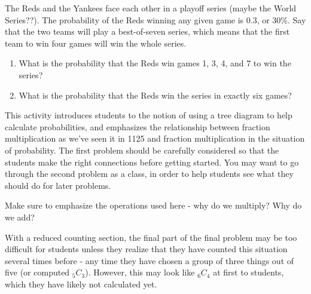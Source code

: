 \documentclass{ximera}
\begin{document}
\begin{problem}
The Reds and the Yankees face each other in a playoff series (maybe the World Series??).  The probability of the Reds winning any given game is 0.3, or 30\%.  Say that the two teams will play a best-of-seven series, which means that the first team to win four games will win the whole series.

\begin{enumerate}
\item What is the probability that the Reds win games 1, 3, 4, and 7 to win the series?
\item What is the probability that the Reds win the series in exactly six games?
\end{enumerate}
\end{problem}


\newpage

\begin{instructorNotes}
This activity introduces students to the notion of using a tree diagram to help calculate probabilities, and emphasizes the relationship between fraction multiplication as we've seen it in 1125 and fraction multiplication in the situation of probability.  The first problem should be carefully considered so that the students make the right connections before getting started.  You may want to go through the second problem as a class, in order to help students see what they should do for later problems.

Make sure to emphasize the operations used here - why do we multiply?  Why do we add?

With a reduced counting section, the final part of the final problem may be too difficult for students unless they realize that they have counted this situation several times before - any time they have chosen a group of three things out of five (or computed $_5C_3$).  However, this may look like $_6C_4$ at first to students, which they have likely not calculated yet.
\end{instructorNotes}
\end{document}
